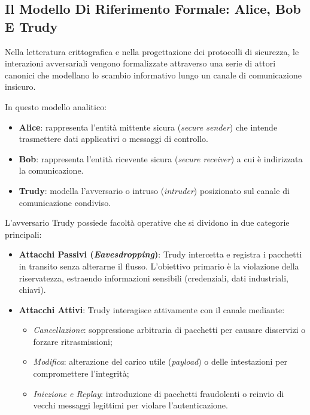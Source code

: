 \documentclass[11pt, a4paper]{article}
\begin{document}
\subsection{Il Modello Di Riferimento Formale: Alice, Bob E Trudy}

Nella letteratura crittografica e nella progettazione dei protocolli di sicurezza, le interazioni avversariali vengono formalizzate attraverso una serie di attori canonici che modellano lo scambio informativo lungo un canale di comunicazione insicuro.


In questo modello analitico:
\begin{itemize}[noitemsep]
    \item \textbf{Alice}: rappresenta l'entità mittente sicura (\emph{secure sender}) che intende trasmettere dati applicativi o messaggi di controllo.
    \item \textbf{Bob}: rappresenta l'entità ricevente sicura (\emph{secure receiver}) a cui è indirizzata la comunicazione.
    \item \textbf{Trudy}: modella l'avversario o intruso (\emph{intruder}) posizionato sul canale di comunicazione condiviso.
\end{itemize}

L'avversario Trudy possiede facoltà operative che si dividono in due categorie principali:
\begin{itemize}[leftmargin=*]
    \item \textbf{Attacchi Passivi (\emph{Eavesdropping})}: Trudy intercetta e registra i pacchetti in transito senza alterarne il flusso. L'obiettivo primario è la violazione della riservatezza, estraendo informazioni sensibili (credenziali, dati industriali, chiavi).
    \item \textbf{Attacchi Attivi}: Trudy interagisce attivamente con il canale mediante:
    \begin{itemize}[noitemsep]
        \item \emph{Cancellazione}: soppressione arbitraria di pacchetti per causare disservizi o forzare ritrasmissioni;
        \item \emph{Modifica}: alterazione del carico utile (\emph{payload}) o delle intestazioni per compromettere l'integrità;
        \item \emph{Iniezione e Replay}: introduzione di pacchetti fraudolenti o reinvio di vecchi messaggi legittimi per violare l'autenticazione.
    \end{itemize}
\end{itemize}
\end{document}
